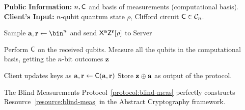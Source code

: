 \begin{protocoll}
    \caption{Blind measurements}
    \label{protocol:blind-meas}
    \begin{algorithmic}[1]
        \State \textbf{Public Information:} $n, \mathsf{C}$ and basis of measurements (computational basis).
        \State \textbf{Client's Input:} $n$-qubit quantum state $\rho$, Clifford circuit $\mathsf{C}\in\mathcal{C}_n$.

        \State Sample $\a, \r\gets \bin^{n}$ and send $\mathsf{X}^{\mathbf a}\mathsf{Z}^{\mathbf r}[\rho]$ to Server
        \EndProcedure

        \State Perform $\mathsf{C}$ on the received qubits.
        \State Measure all the qubits in the computational basis, getting the $n$-bit outcomes $\mathbf z$
        \EndProcedure

        \State Client updates keys as $\mathbf a, \mathbf r\gets \mathsf{C}(\mathbf a, \mathbf r)$
        \State Store $\mathbf z\oplus \mathbf a$ as output of the protocol.
        \EndProcedure
    \end{algorithmic}
\end{protocoll}

\begin{theorem}
    \label{thm:blind-meas}
    The Blind Measurements Protocol~\ref{protocol:blind-meas} perfectly constructs Resource~\ref{resource:blind-meas}
    in the Abstract Cryptography framework.
    \end{theorem}

